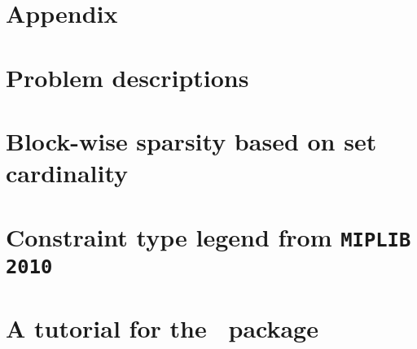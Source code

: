 \section*{Appendix}

\section{Problem descriptions} \label{sec:prob_desc}


\section{Block-wise sparsity based on set cardinality} \label{sec:sparsity}


\section{Constraint type legend from \texttt{MIPLIB 2010}} \label{sec:miplibconstraint}


\section{A tutorial for the \julia\ package} \label{sec:tutorial}






